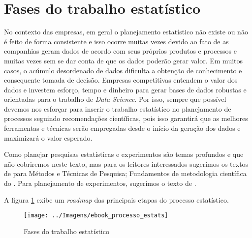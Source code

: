 \documentclass[11pt,]{style/krantz}
\theoremstyle{definition}
\theoremstyle{definition}
\theoremstyle{definition}
\theoremstyle{remark}
\begin{document}
\hypertarget{fases-do-trabalho-estatistico}{%
\section{Fases do trabalho estatístico}\label{fases-do-trabalho-estatistico}}

No contexto das empresas, em geral o planejamento estatístico não existe ou não é feito de forma consistente e isso ocorre muitas vezes devido ao fato de as companhias geram dados de acordo com seus próprios produtos e processos e muitas vezes sem se dar conta de que os dados poderão gerar valor. Em muitos casos, o acúmulo desordenado de dados dificulta a obtenção de conhecimento e consequente tomada de decisão. Empresas competitivas entendem o valor dos dados e investem esforço, tempo e dinheiro para gerar bases de dados robustas e orientadas para o trabalho de \emph{Data Science}. Por isso, sempre que possível devemos nos esforçar para inserir o trabalho estatístico no planejamento de processos seguindo recomendações científicas, pois isso garantirá que as melhores ferramentas e técnicas serão empregadas desde o início da geração dos dados e maximizará o valor esperado.

Como planejar pesquisas estatísticas e experimentos são temas profundos e que não cobriremos neste texto, mas para os leitores interessados sugerimos os textos de \citep{gil2008metodos} para Métodos e Técnicas de Pesquisa; Fundamentos de metodologia científica do \citep{koche2016fundamentos}. Para planejamento de experimentos, sugerimos o texto de \citep{montgomery2017design}.

A figura \ref{fig:fig00} exibe um \emph{roadmap} das principais etapas do processo estatístico.

\begin{figure}[H]

{\centering \texttt{[image: ../Imagens/ebook\_processo\_estats]}

}

\caption{Fases do trabalho estatístico}\label{fig:fig00}
\end{figure}
\end{document}
